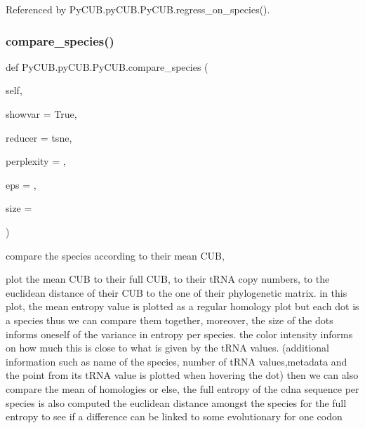 Referenced by Py\+C\+U\+B.\+py\+C\+U\+B.\+Py\+C\+U\+B.\+regress\+\_\+on\+\_\+species().

\mbox{\label{class_py_c_u_b_1_1py_c_u_b_1_1_py_c_u_b_ad7f24b316bc8c257719da20c0792ec01}} 
\subsubsection{\texorpdfstring{compare\+\_\+species()}{compare\_species()}}
{\footnotesize\ttfamily def Py\+C\+U\+B.\+py\+C\+U\+B.\+Py\+C\+U\+B.\+compare\+\_\+species (\begin{DoxyParamCaption}\item[{}]{self,  }\item[{}]{showvar = {\ttfamily True},  }\item[{}]{reducer = {\ttfamily \textquotesingle{}tsne\textquotesingle{}},  }\item[{}]{perplexity = {},  }\item[{}]{eps = {},  }\item[{}]{size = {} }\end{DoxyParamCaption})}



compare the species according to their mean C\+UB, 

plot the mean C\+UB to their full C\+UB, to their t\+R\+NA copy numbers, to the euclidean distance of their C\+UB to the one of their phylogenetic matrix. in this plot, the mean entropy value is plotted as a regular homology plot but each dot is a species thus we can compare them together, moreover, the size of the dots informs oneself of the variance in entropy per species. the color intensity informs on how much this is close to what is given by the t\+R\+NA values. (additional information such as name of the species, number of t\+R\+NA values,metadata and the point from its t\+R\+NA value is plotted when hovering the dot) then we can also compare the mean of homologies or else, the full entropy of the cdna sequence per species is also computed the euclidean distance amongst the species for the full entropy to see if a difference can be linked to some evolutionary for one codon


